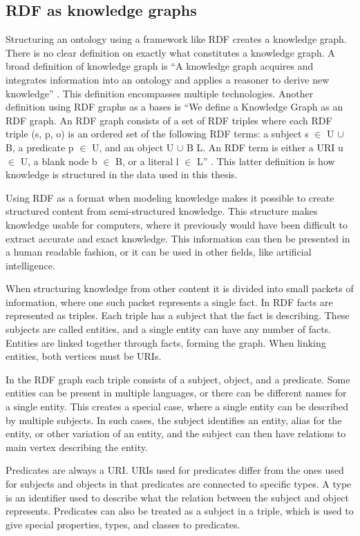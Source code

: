 \subsection{RDF as knowledge graphs}
Structuring an ontology using a framework like RDF creates a knowledge graph. There is no clear definition on exactly what constitutes a knowledge graph. A broad definition of knowledge graph is ``A knowledge graph acquires and integrates information into an ontology and applies a reasoner to derive new knowledge'' \citep{KGDef}. This definition encompasses multiple technologies. Another definition using RDF graphs as a bases is ``We define a Knowledge Graph as an RDF graph. An RDF graph consists of a set of RDF triples where each RDF triple (s, p, o) is an ordered set of the following RDF terms: a subject s $\in$ U $\cup$ B, a predicate p $\in$ U, and an object U $\cup$ B  L. An RDF term is either a URI u $\in$ U, a blank node b $\in$ B, or a literal l $\in$ L'' \citep{KGDefYago}. This latter definition is how knowledge is structured in the data used in this thesis.

Using RDF as a format when modeling knowledge makes it possible to create structured content from semi-structured knowledge. This structure makes knowledge usable for computers, where it previously would have been difficult to extract accurate and exact knowledge. This information can then be presented in a human readable fashion, or it can be used in other fields, like artificial intelligence.

When structuring knowledge from other content it is divided into small packets of information, where one such packet represents a single fact. In RDF facts are represented as triples. Each triple has a subject that the fact is describing. These subjects are called entities, and a single entity can have any number of facts. Entities are linked together through facts, forming the graph. When linking entities, both vertices must be URIs.

In the RDF graph each triple consists of a subject, object, and a predicate. Some entities can be present in multiple languages, or there can be different names for a single entity. This creates a special case, where a single entity can be described by multiple subjects. In such cases, the subject identifies an entity, alias for the entity, or other variation of an entity, and the subject can then have relations to main vertex describing the entity.

Predicates are always a URI. URIs used for predicates differ from the ones used for subjects and objects in that predicates are connected to specific types. A type is an identifier used to describe what the relation between the subject and object represents. Predicates can also be treated as a subject in a triple, which is used to give special properties, types, and classes to predicates.

